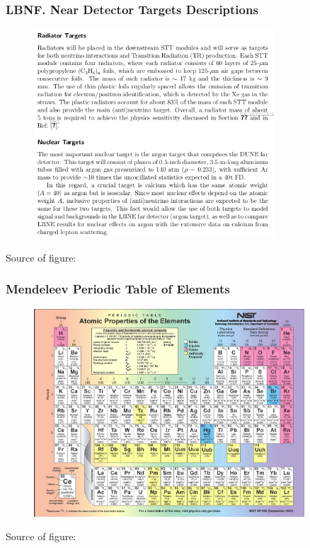 \begin{frame}\frametitle{LBNF. Near Detector Targets Descriptions}
\begin{figure}
\centering
\includegraphics[width=0.80\textwidth, keepaspectratio=true]{figs/nearDetector_TargetsDescription.png}
\end{figure}
\tiny
Source of figure: \cite{ref_LBNFdoc_volume-detectors}
\end{frame}

\begin{frame}\frametitle{Mendeleev Periodic Table of Elements}
\begin{figure}
\centering
\includegraphics[width=0.90\textwidth, keepaspectratio=true]{figs/MendeleevTable.png}
\end{figure}
\tiny
Source of figure: \cite{ref_fig_MendeleevTable}
\end{frame}


